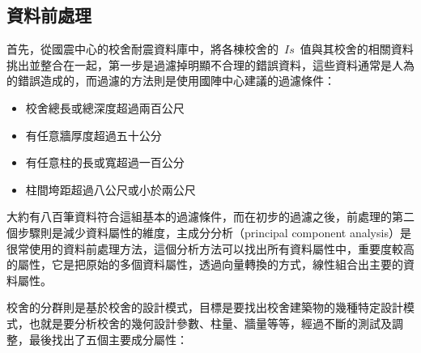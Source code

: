 
\subsection{資料前處理}

首先，從國震中心的校舍耐震資料庫中，將各棟校舍的~$Is$~值與其校舍的相關資料挑出並整合在一起，第一步是過濾掉明顯不合理的錯誤資料，這些資料通常是人為的錯誤造成的，而過濾的方法則是使用國陣中心建議的過濾條件：

\begin{itemize}
\item 校舍總長或總深度超過兩百公尺
\item 有任意牆厚度超過五十公分
\item 有任意柱的長或寬超過一百公分
\item 柱間垮距超過八公尺或小於兩公尺
\end{itemize}

大約有八百筆資料符合這組基本的過濾條件，而在初步的過濾之後，前處理的第二個步驟則是減少資料屬性的維度，主成分分析（principal component analysis）是很常使用的資料前處理方法，這個分析方法可以找出所有資料屬性中，重要度較高的屬性，它是把原始的多個資料屬性，透過向量轉換的方式，線性組合出主要的資料屬性。


校舍的分群則是基於校舍的設計模式，目標是要找出校舍建築物的幾種特定設計模式，也就是要分析校舍的幾何設計參數、柱量、牆量等等，經過不斷的測試及調整，最後找出了五個主要成分屬性：

